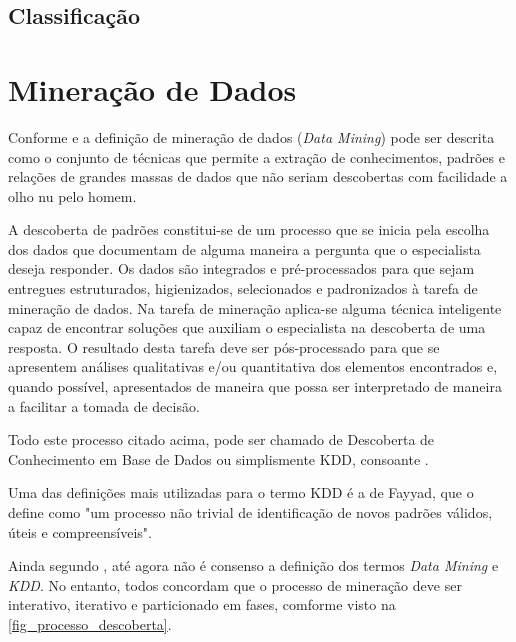 \documentclass[
	12pt,				%
	openright,			%
	twoside,			%
	a4paper,			%
	english,			%
	french,				%
	spanish,			%
	brazil				%
	]{abntex2}
\begin{document}
\subsection{Classificação}
\section{Mineração de Dados}
Conforme  e   a definição de mineração de dados (\emph{Data Mining}) pode ser descrita como o conjunto de técnicas que permite a extração de conhecimentos, padrões e relações de grandes massas de dados que não seriam descobertas com facilidade a olho nu pelo homem.

A descoberta de padrões constitui-se de um processo que se inicia pela escolha dos dados que documentam de alguma maneira a pergunta que o especialista deseja responder. Os dados são integrados e pré-processados para que sejam entregues estruturados, higienizados, selecionados e padronizados à tarefa de mineração de dados. Na tarefa de mineração aplica-se alguma técnica inteligente capaz de encontrar soluções que auxiliam o especialista na descoberta de uma resposta. O resultado desta tarefa deve ser pós-processado para que se apresentem análises qualitativas e/ou quantitativa dos elementos encontrados e, quando possível, apresentados de maneira que possa ser interpretado de maneira a facilitar a tomada de decisão. \cite[p.569 - p.570]{inproceedings}

Todo este processo citado acima, pode ser chamado de Descoberta de Conhecimento em Base de Dados ou simplismente KDD, consoante .

Uma das definições mais utilizadas para o termo KDD é a de Fayyad, que o define como "um processo não trivial de identificação de novos padrões válidos, úteis e compreensíveis".\cite[p.3]{camilo2009mineraccao}

Ainda segundo , até agora não é consenso a definição dos termos \emph{Data Mining} e \emph{KDD}. No entanto, todos concordam que o processo de mineração deve ser interativo, iterativo e particionado em fases, comforme visto na \autoref{fig_processo_descoberta}. 
\end{document}
